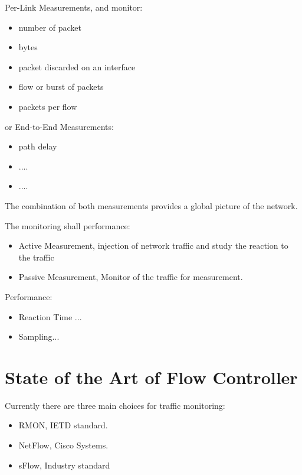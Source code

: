 \noindent Per-Link Measurements, and monitor:

		\begin{itemize}	
			\item number of packet
			\item bytes
			\item packet discarded on an interface
			\item flow or burst of packets
			\item packets per flow
		\end{itemize}

\noindent or End-to-End Measurements:
		\begin{itemize}	
			\item path delay  
			\item ....
			\item ....
		\end{itemize} 

\noindent The combination of both measurements provides a global picture of the
network.


\vspace{10 mm}

\noindent The monitoring shall performance:

\begin{itemize}
	\item Active Measurement, injection of network traffic and study the
reaction to the traffic
	\item Passive Measurement,  Monitor of the traffic for measurement.
\end{itemize}

\vspace{10 mm}

\noindent Performance:

\begin{itemize}

	\item Reaction Time ... 
	\item Sampling...
	
\end{itemize}


\section{State of the Art of Flow Controller}

Currently there are three main choices for traffic monitoring:

\begin{itemize}

	\item RMON, IETD standard.
	\item NetFlow, Cisco Systems.
	\item sFlow, Industry standard
\end{itemize}

